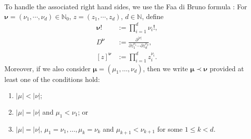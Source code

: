 \documentclass[reqno,12pt]{amsart}
\numberwithin{equation}{section}
\begin{document}
To handle the associated right hand sides, we use the Faa di Bruno formula \cite{constantine1996a}: For $\mathbf \nu=(\nu_1,\cdots, \nu_d)\in \mathbb N_0$, $z=(z_1,\cdots,z_d)$, $d\in \mathbb N$, define 
\begin{align*}
 \mathbf \nu ! &:= \prod_{i=1}^d \nu_i !,\\
 D^{\mathbf \nu}&:=\frac{\partial^{\vert \mathbb \nu\vert}}{\partial z_1^{\nu_1}\cdots \partial z_d^{\mathbb \nu_d} },\\
 [z]^{\mathbf \nu}&:=\prod_{i=1}^d z_i^{\nu_i}.
\end{align*}
Moreover, if we also consider $\mathbf \mu=(\mu_1,\ldots,\nu_d)$, then we write $\mathbf \mu\prec \mathbf \nu$ provided at least one of the conditions hold:
\begin{enumerate}
 \item $\vert \mu\vert <\vert \nu\vert$;
 \item $\vert \mu\vert =\vert \nu\vert$ and $\mu_1<\nu_1$; or
 \item $\vert \mu\vert =\vert \nu\vert$, $\mu_1=\nu_1,\ldots,\mu_k=\nu_k$ and $\mu_{k+1}<\nu_{k+1}$ for some $1\le k<d$. 
\end{enumerate}
\end{document}
